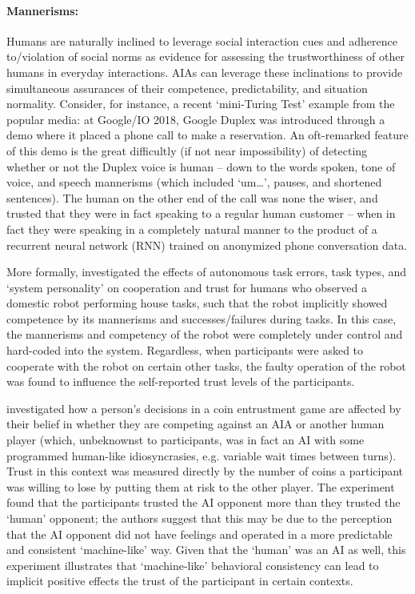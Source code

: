 \paragraph{Mannerisms:}
Humans are naturally inclined to leverage social interaction cues and adherence to/violation of social norms as evidence for assessing the trustworthiness of other humans in everyday interactions. 
AIAs can leverage these inclinations to provide simultaneous assurances of their competence, predictability, and situation normality. 
Consider, for instance, a recent `mini-Turing Test' example from the popular media: at Google/IO 2018, Google Duplex \cite{Google2018-eb} was introduced through a demo where it placed a phone call to make a reservation. 
An oft-remarked feature of this demo is the great difficultly (if not near impossibility) of detecting whether or not the Duplex voice is human -- down to the words spoken, tone of voice, and speech mannerisms (which included `um\ldots', pauses, and shortened sentences). 
The human on the other end of the call was none the wiser, and trusted that they were in fact speaking to a regular human customer -- when in fact they were speaking in a completely natural manner to the product of a recurrent neural network (RNN) trained on anonymized phone conversation data. 

More formally, \citet{Salem2015-md} investigated the effects of autonomous task errors, task types, and `system personality' on cooperation and trust for humans who observed a domestic robot performing house tasks, such that the robot implicitly showed competence by its mannerisms and successes/failures during tasks. In this case, the mannerisms and competency of the robot were completely under control and hard-coded into the system. Regardless, when participants were asked to cooperate with the robot on certain other tasks, the faulty operation of the robot was found to influence the self-reported trust levels of the participants.

\citet{Wu2016-ei} investigated how a person's decisions in a coin entrustment game are affected by their belief in whether they are competing against an AIA or another human player (which, unbeknownst to participants, was in fact an AI with some programmed human-like idiosyncrasies, e.g. variable wait times between turns). Trust in this context was measured directly by the number of coins a participant was willing to lose by putting them at risk to the other player. The experiment found that the participants trusted the AI opponent more than they trusted the `human' opponent; the authors suggest that this may be due to the perception that the AI opponent did not have feelings and operated in a more predictable and consistent `machine-like' way. Given that the `human' was an AI as well, this experiment illustrates that `machine-like' behavioral consistency can lead to implicit positive effects the trust of the participant in certain contexts.

